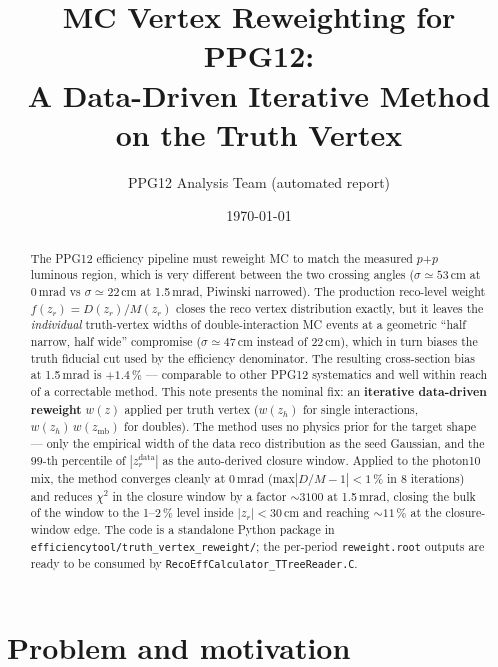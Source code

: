 \documentclass[11pt,a4paper]{article}
\title{MC Vertex Reweighting for PPG12:\\[2pt]
\large A Data-Driven Iterative Method on the Truth Vertex}
\author{PPG12 Analysis Team (automated report)}
\date{\today}
\begin{document}
\maketitle

\begin{abstract}\noindent
The PPG12 efficiency pipeline must reweight MC to match the measured
$p$+$p$ luminous region, which is very different between the two
crossing angles ($\sigma\!\simeq\!53$\,cm at 0\,mrad vs
$\sigma\!\simeq\!22$\,cm at 1.5\,mrad, Piwinski narrowed). The
production reco-level weight $f(z_r) = D(z_r)/M(z_r)$ closes the reco
vertex distribution exactly, but it leaves the \emph{individual}
truth-vertex widths of double-interaction MC events at a geometric
``half narrow, half wide'' compromise
($\sigma\!\simeq\!47$\,cm instead of 22\,cm), which in turn biases
the truth fiducial cut used by the efficiency denominator. The
resulting cross-section bias at 1.5\,mrad is $+1.4\,\%$ --- comparable
to other PPG12 systematics and well within reach of a correctable
method. This note presents the nominal fix: an \textbf{iterative
data-driven reweight} $w(z)$ applied per truth vertex
($w(z_h)$ for single interactions, $w(z_h)\,w(z_\mathrm{mb})$ for
doubles). The method uses no physics prior for the target shape ---
only the empirical width of the data reco distribution as the seed
Gaussian, and the $99$-th percentile of $|z_r^\mathrm{data}|$ as the
auto-derived closure window. Applied to the photon10 mix, the method
converges cleanly at 0\,mrad (max$|D/M\!-\!1|\!<\!1\,\%$ in 8 iterations)
and reduces $\chi^2$ in the closure window by a factor $\sim\!3100$ at
1.5\,mrad, closing the bulk of the window to the 1--2\,\% level inside
$|z_r|\!<\!30$\,cm and reaching $\sim\!11\,\%$ at the closure-window
edge.
The code is a standalone Python package in
\texttt{efficiencytool/truth\_vertex\_reweight/}; the
per-period \texttt{reweight.root} outputs are ready to be consumed by
\texttt{RecoEffCalculator\_TTreeReader.C}.
\end{abstract}

\tableofcontents

\section{Problem and motivation}
\label{sec:problem}
\end{document}
